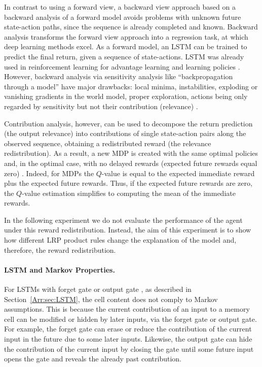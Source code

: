 \documentclass[runningheads]{llncs}
\begin{document}
In contrast to using a forward view, 
a backward view approach based on a backward analysis
of a forward model
avoids problems with unknown future state-action paths, 
since the sequence is already completed and known. 
Backward analysis transforms the forward view approach 
into a regression task, at which deep learning methods excel. 
As a forward model, an LSTM can be trained to predict the 
final return, given a sequence of state-actions.
LSTM was already used in reinforcement learning \cite{Arr:Schmidhuber:15}
for advantage learning \cite{Arr:Bakker:02} and
learning policies \cite{Arr:Hausknecht:15,Arr:Mnih:16,Arr:Heess:16}.
However, backward analysis via sensitivity analysis like ``backpropagation through a model''
\cite{Arr:Munro:87,Arr:Robinson:89,Arr:RobinsonFallside:89,Arr:Bakker:07} have
major drawbacks:
local minima, instabilities, exploding or vanishing
gradients in the world model, proper exploration,
actions being only regarded by sensitivity but not their contribution 
(relevance) \cite{Arr:Hochreiter:90,Arr:Schmidhuber:90diff}.

Contribution analysis, however, 
can be used to decompose the return prediction (the output relevance) into 
contributions of single state-action pairs along the observed sequence, 
obtaining a redistributed reward (the relevance redistribution).
As a result, 
a new MDP is created with the same optimal policies and, 
in the optimal case, with no delayed rewards (expected future rewards equal zero) \cite{Arr:Arjona-Medina:18}.
Indeed, for MDPs the $Q$-value is equal to the expected immediate reward 
plus the expected future rewards. Thus, if the expected future rewards are zero,
the $Q$-value estimation simplifies to computing the mean of the immediate
rewards.

In the following experiment we do not evaluate 
the performance of the agent under this reward redistribution.
Instead, the aim of this experiment is to show how
different LRP product rules
change the explanation of the model and, therefore,
the reward redistribution. 

\paragraph{LSTM and Markov Properties.}
For LSTMs with forget gate or output gate \cite{Arr:Greff:15}, as described in Section~\ref{Arr:sec:LSTM}, the cell content does not comply to Markov assumptions.
This is because the current contribution of an input to a memory cell can be modified or hidden by later inputs, via the forget gate or output gate.
For example, the forget gate can erase or reduce the contribution of the current input in the future due to some later inputs.
Likewise, the output gate can hide the contribution of the current input by closing the gate until some future input opens the gate and reveals the already past contribution.
\end{document}
